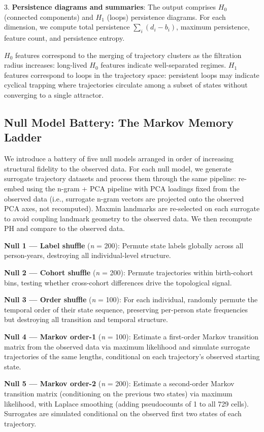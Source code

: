 3. \textbf{Persistence diagrams and summaries}: The output comprises $H_0$ (connected components) and $H_1$ (loops) persistence diagrams. For each dimension, we compute total persistence $\sum_i (d_i - b_i)$, maximum persistence, feature count, and persistence entropy.

$H_0$ features correspond to the merging of trajectory clusters as the filtration radius increases: long-lived $H_0$ features indicate well-separated regimes. $H_1$ features correspond to loops in the trajectory space: persistent loops may indicate cyclical trapping where trajectories circulate among a subset of states without converging to a single attractor.

\subsection{Null Model Battery: The Markov Memory Ladder}

We introduce a battery of five null models arranged in order of increasing structural fidelity to the observed data. For each null model, we generate surrogate trajectory datasets and process them through the same pipeline: re-embed using the n-gram + PCA pipeline with PCA loadings fixed from the observed data (i.e., surrogate n-gram vectors are projected onto the observed PCA axes, not recomputed). Maxmin landmarks are re-selected on each surrogate to avoid coupling landmark geometry to the observed data. We then recompute PH and compare to the observed data.

\textbf{Null 1 --- Label shuffle} (\textit{n} = 200): Permute state labels globally across all person-years, destroying all individual-level structure.

\textbf{Null 2 --- Cohort shuffle} (\textit{n} = 200): Permute trajectories within birth-cohort bins, testing whether cross-cohort differences drive the topological signal.

\textbf{Null 3 --- Order shuffle} (\textit{n} = 100): For each individual, randomly permute the temporal order of their state sequence, preserving per-person state frequencies but destroying all transition and temporal structure.

\textbf{Null 4 --- Markov order-1} (\textit{n} = 100): Estimate a first-order Markov transition matrix from the observed data via maximum likelihood and simulate surrogate trajectories of the same lengths, conditional on each trajectory's observed starting state.

\textbf{Null 5 --- Markov order-2} (\textit{n} = 200): Estimate a second-order Markov transition matrix (conditioning on the previous two states) via maximum likelihood, with Laplace smoothing (adding pseudocounts of 1 to all 729 cells). Surrogates are simulated conditional on the observed first two states of each trajectory.


